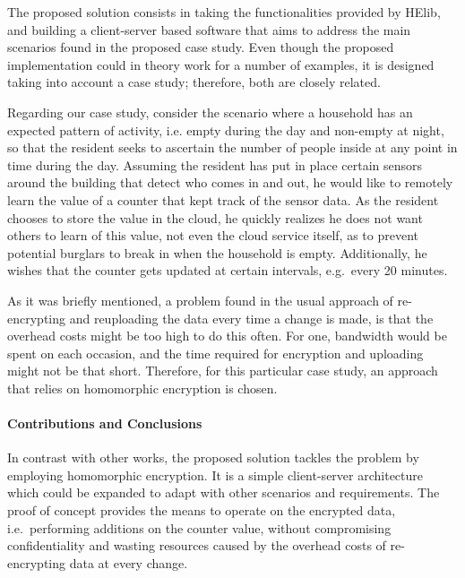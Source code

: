 The proposed solution consists in taking the functionalities provided by HElib, and building a client-server based software that aims to address the main scenarios found in the proposed case study. Even though the proposed implementation could in theory work for a number of examples, it is designed taking into account a case study; therefore, both are closely related.

Regarding our case study, consider the scenario where a household has an expected pattern of activity, i.e. empty during the day and non-empty at night, so that the resident seeks to ascertain the number of people inside at any point in time during the day. Assuming the resident has put in place certain sensors around the building that detect who comes in and out, he would like to remotely learn the value of a counter that kept track of the sensor data. As the resident chooses to store the value in the cloud, he quickly realizes he does not want others to learn of this value, not even the cloud service itself, as to prevent potential burglars to break in when the household is empty. Additionally, he wishes that the counter gets updated at certain intervals, e.g.\ every 20 minutes. 

As it was briefly mentioned, a problem found in the usual approach of re-encrypting and reuploading the data every time a change is made, is that the overhead costs might be too high to do this often. For one, bandwidth would be spent on each occasion, and the time required for encryption and uploading might not be that short. Therefore, for this particular case study, an approach that relies on homomorphic encryption is chosen.

\paragraph{Contributions and Conclusions}
In contrast with other works, the proposed solution tackles the problem by employing homomorphic encryption. It is a simple client-server architecture which could be expanded to adapt with other scenarios and requirements. The proof of concept provides the means to operate on the encrypted data, i.e.\ performing additions on the counter value, without compromising confidentiality and wasting resources caused by the overhead costs of re-encrypting data at every change.


